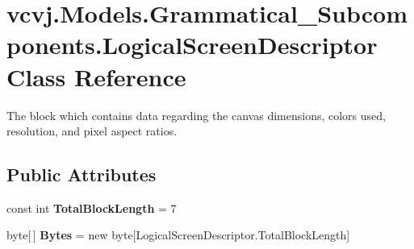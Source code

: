 \hypertarget{classvcvj_1_1_models_1_1_grammatical___subcomponents_1_1_logical_screen_descriptor}{}\section{vcvj.\+Models.\+Grammatical\+\_\+\+Subcomponents.\+Logical\+Screen\+Descriptor Class Reference}
\label{classvcvj_1_1_models_1_1_grammatical___subcomponents_1_1_logical_screen_descriptor}


The block which contains data regarding the canvas dimensions, colors used, resolution, and pixel aspect ratios.  


\subsection*{Public Attributes}
\begin{DoxyCompactItemize}
\item 
const int {\bfseries Total\+Block\+Length} = 7\hypertarget{classvcvj_1_1_models_1_1_grammatical___subcomponents_1_1_logical_screen_descriptor_a99fe685a6b7979b4a587e6c39b6102a4}{}\label{classvcvj_1_1_models_1_1_grammatical___subcomponents_1_1_logical_screen_descriptor_a99fe685a6b7979b4a587e6c39b6102a4}

\item 
byte\mbox{[}$\,$\mbox{]} {\bfseries Bytes} = new byte\mbox{[}Logical\+Screen\+Descriptor.\+Total\+Block\+Length\mbox{]}\hypertarget{classvcvj_1_1_models_1_1_grammatical___subcomponents_1_1_logical_screen_descriptor_aef4aab2853527069b9711047cae22f7a}{}\label{classvcvj_1_1_models_1_1_grammatical___subcomponents_1_1_logical_screen_descriptor_aef4aab2853527069b9711047cae22f7a}

\end{DoxyCompactItemize}
